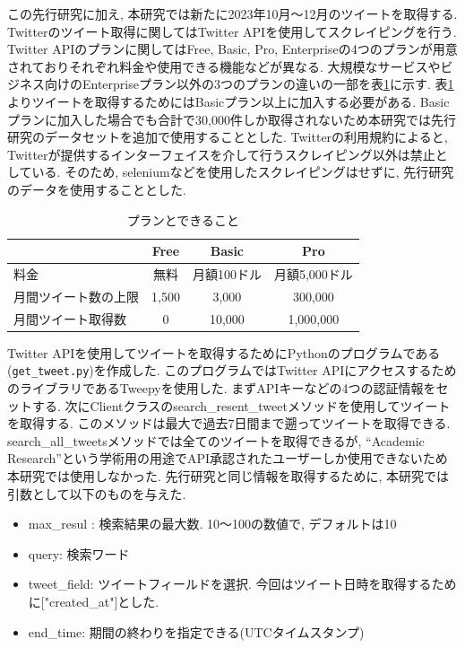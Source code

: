 この先行研究に加え, 本研究では新たに2023年10月〜12月のツイートを取得する. Twitterのツイート取得に関してはTwitter APIを使用してスクレイピングを行う. Twitter APIのプランに関してはFree, Basic, Pro, Enterpriseの4つのプランが用意されておりそれぞれ料金や使用できる機能などが異なる. 大規模なサービスやビジネス向けのEnterpriseプラン以外の3つのプランの違いの一部を表\ref{tb:xplan}に示す. 
表\ref{tb:xplan}よりツイートを取得するためにはBasicプラン以上に加入する必要がある. Basicプランに加入した場合でも合計で30,000件しか取得されないため本研究では先行研究のデータセットを追加で使用することとした. Twitterの利用規約によると, Twitterが提供するインターフェイスを介して行うスクレイピング以外は禁止としている. そのため, seleniumなどを使用したスクレイピングはせずに, 先行研究のデータを使用することとした. 

\begin{table}[H]
  \caption{プランとできること}
  \label{tb:xplan}
  \begin{center}
  \begin{tabular}{|l|c|c|c|}
    \hline
    &Free&Basic&Pro \\\hline\hline
    料金&無料&月額100ドル&月額5,000ドル \\\hline
    月間ツイート数の上限&1,500&3,000&300,000 \\\hline
    月間ツイート取得数&0&10,000&1,000,000 \\\hline
  \end{tabular}\end{center}
\end{table}

Twitter APIを使用してツイートを取得するためにPythonのプログラムである(\verb|get_tweet.py|)を作成した. このプログラムではTwitter APIにアクセスするためのライブラリであるTweepy\cite{tweepy}を使用した. まずAPIキーなどの4つの認証情報をセットする. 次にClientクラスのsearch\_resent\_tweetメソッドを使用してツイートを取得する. 
このメソッドは最大で過去7日間まで遡ってツイートを取得できる. search\_all\_tweetsメソッドでは全てのツイートを取得できるが, ``Academic Research''という学術用の用途でAPI承認されたユーザーしか使用できないため本研究では使用しなかった. 
先行研究と同じ情報を取得するために, 本研究では引数として以下のものを与えた. 
\begin{itemize}
 \item max\_resul : 検索結果の最大数. 10〜100の数値で, デフォルトは10
 \item query: 検索ワード
 \item tweet\_field: ツイートフィールドを選択. 今回はツイート日時を取得するために["created\_at"]とした. 
 \item end\_time: 期間の終わりを指定できる(UTCタイムスタンプ)
\end{itemize}

